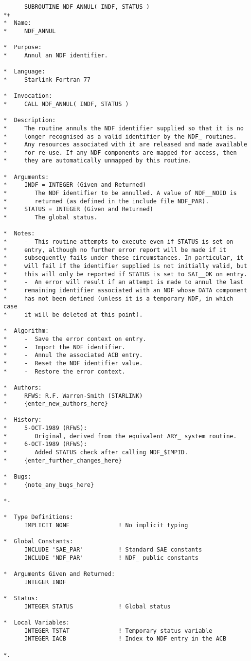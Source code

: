 \small
\begin{verbatim}
      SUBROUTINE NDF_ANNUL( INDF, STATUS )
*+
*  Name:
*     NDF_ANNUL

*  Purpose:
*     Annul an NDF identifier.

*  Language:
*     Starlink Fortran 77

*  Invocation:
*     CALL NDF_ANNUL( INDF, STATUS )

*  Description:
*     The routine annuls the NDF identifier supplied so that it is no
*     longer recognised as a valid identifier by the NDF_ routines.
*     Any resources associated with it are released and made available
*     for re-use. If any NDF components are mapped for access, then
*     they are automatically unmapped by this routine.

*  Arguments:
*     INDF = INTEGER (Given and Returned)
*        The NDF identifier to be annulled. A value of NDF__NOID is
*        returned (as defined in the include file NDF_PAR).
*     STATUS = INTEGER (Given and Returned)
*        The global status.

*  Notes:
*     -  This routine attempts to execute even if STATUS is set on
*     entry, although no further error report will be made if it
*     subsequently fails under these circumstances. In particular, it
*     will fail if the identifier supplied is not initially valid, but
*     this will only be reported if STATUS is set to SAI__OK on entry.
*     -  An error will result if an attempt is made to annul the last
*     remaining identifier associated with an NDF whose DATA component
*     has not been defined (unless it is a temporary NDF, in which case
*     it will be deleted at this point).

*  Algorithm:
*     -  Save the error context on entry.
*     -  Import the NDF identifier.
*     -  Annul the associated ACB entry.
*     -  Reset the NDF identifier value.
*     -  Restore the error context.

*  Authors:
*     RFWS: R.F. Warren-Smith (STARLINK)
*     {enter_new_authors_here}

*  History:
*     5-OCT-1989 (RFWS):
*        Original, derived from the equivalent ARY_ system routine.
*     6-OCT-1989 (RFWS):
*        Added STATUS check after calling NDF_$IMPID.
*     {enter_further_changes_here}

*  Bugs:
*     {note_any_bugs_here}

*-
      
*  Type Definitions:
      IMPLICIT NONE              ! No implicit typing

*  Global Constants:
      INCLUDE 'SAE_PAR'          ! Standard SAE constants
      INCLUDE 'NDF_PAR'          ! NDF_ public constants

*  Arguments Given and Returned:
      INTEGER INDF

*  Status:
      INTEGER STATUS             ! Global status

*  Local Variables:
      INTEGER TSTAT              ! Temporary status variable
      INTEGER IACB               ! Index to NDF entry in the ACB

*.
\end{verbatim}
\normalsize

